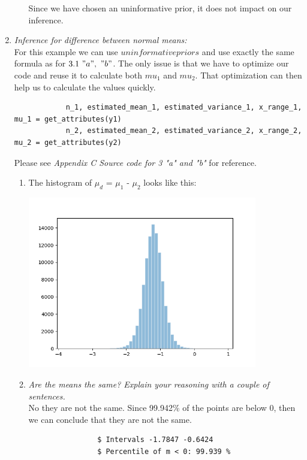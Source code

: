 \documentclass[11pt,a4paper,english]{article}
\begin{document}
\begin{enumerate}
\begin{enumerate}[label=\alph*.]
              Since we have chosen an uninformative prior, it does not impact on our
              inference.
          \end{enumerate}

        \item \textit{Inference for difference between normal means:}\\
          For this example we can use $uninformative priors$ and use exactly the same formula
          as for $3.1\ "a",\ "b"$. The only issue is that we have to optimize our code and
          reuse it to calculate both $mu_1$ and $mu_2$. That optimization can then help us to
          calculate the values quickly.
          \begin{verbatim}
            n_1, estimated_mean_1, estimated_variance_1, x_range_1, mu_1 = get_attributes(y1)
            n_2, estimated_mean_2, estimated_variance_2, x_range_2, mu_2 = get_attributes(y2)
          \end{verbatim}
          Please see \textit{Appendix C  Source code for 3 "a" and "b"} for reference.

          \begin{enumerate}[label=\alph*.]
            \item The histogram of $\mu_d$ = $\mu_1$ - $\mu_2$ looks like this:

              \includegraphics[width=10cm]{3_3_a_histogram.png}

            \item \textit{Are the means the same? Explain your reasoning with a couple of sentences.}\\
              No they are not the same. Since 99.942\% of the points are below 0, then we can conclude that they are not the same.

              \begin{verbatim}
                $ Intervals -1.7847 -0.6424
                $ Percentile of m < 0: 99.939 %
              \end{verbatim}
          \end{enumerate}
      \end{enumerate}
\end{document}
